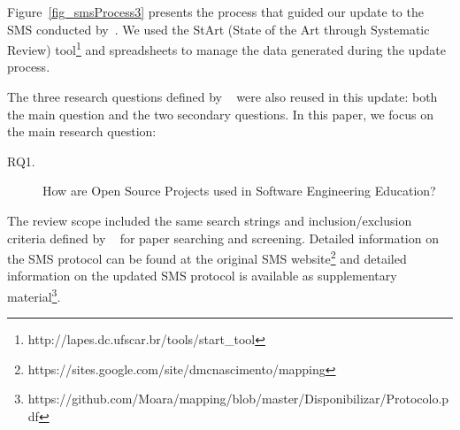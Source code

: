 
Figure~\ref{fig_smsProcess3} presents the process 
that guided our update to the SMS conducted by~\citet{2015:CSE:nascimento}.
%
We used the StArt (State of the Art through Systematic Review) tool\footnote{http://lapes.dc.ufscar.br/tools/start\_tool}
and spreadsheets to manage the
data generated during the update process.

The three research questions defined by
~\citet{2015:CSE:nascimento} were also reused in this update:
both the main question and the two secondary questions.
In this paper, we focus on the main research question:

\begin{description}
\item [RQ1.] How are Open Source Projects used in Software Engineering Education? 
\end{description}


The review scope included the same search strings 
and inclusion/exclusion criteria defined by
~\citeauthor{2015:CSE:nascimento} 
for paper searching and screening.
Detailed information on the SMS protocol
can be found at the original SMS website\footnote{https://sites.google.com/site/dmcnascimento/mapping} 
and detailed information on the updated SMS protocol is available as supplementary material\footnote{https://github.com/Moara/mapping/blob/master/Disponibilizar/Protocolo.pdf}.

